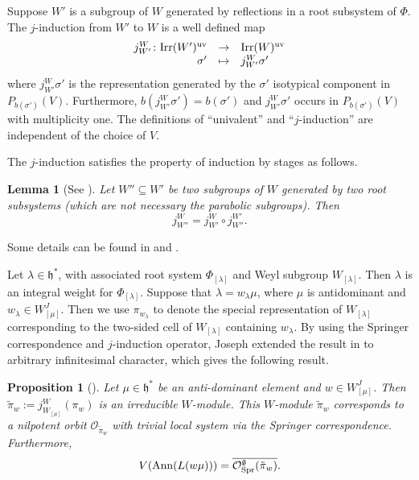 \documentclass[reqno,12pt]{amsart}
\numberwithin{equation}{section}
\theoremstyle{plain}
\newtheorem{Prop}[Thm]{Proposition}
\newtheorem{Lem}[Thm]{Lemma}
\theoremstyle{definition}
\newcommand{\lam}{\lambda}
\newcommand{\Ann}{\mathrm{Ann}}
\renewcommand{\subset}{\subseteq}
\begin{document}
Suppose $W'$ is a subgroup of $W$ generated by reflections in a root subsystem of $\Phi$.   
The $j$-induction from $W'$ to $W$ is a well defined map 
\[
\begin{array}{rcl}
j_{W'}^{W} \colon {\rm Irr}(W')^{\rm uv}& \rightarrow &{\rm Irr}(W)^{\rm uv} \\
\sigma' & \mapsto & j_{W'}^{W}\sigma'
\end{array}
\]
where $j_{W'}^{W}\sigma'$ is the representation generated by the $\sigma'$ 
isotypical component in $P_{b(\sigma')}(V)$. Furthermore, $b(j_{W'}^{W}\sigma') =b(\sigma')$ and $j_{W'}^{W}\sigma'$ occurs in $P_{b(\sigma')}(V)$ with multiplicity one.  
The definitions of ``univalent'' and ``$j$-induction'' are independent of the choice of $V$. 

The $j$-induction satisfies the property of induction by stages as follows. 
\begin{Lem}[{See \cite[Theorem~11.2.4]{Ca85}}]\label{j.1}
Let $W''\subset W'$ be two subgroups of $W$ generated by two root subsystems (which are not necessary the parabolic subgroups). 
Then 
\[
j^W_{W''}=j^W_{W'}\circ j^{W'}_{W''}.
\]
\end{Lem}
Some details can be found in \cite[\S 11.2]{Ca85} and \cite[Chapter~4]{lusztig1984char}.


Let $\lambda\in \mathfrak{h}^*$, with associated root system $\Phi_{[\lambda]}$ and Weyl subgroup $W_{[\lambda]}$. Then $\lam$ is an integral weight for $\Phi_{[\lambda]}$. Suppose that $\lambda=w_{\lambda}\mu$, where $\mu$ is antidominant and $w_{\lambda}\in W_{[\mu]}^J$. Then we use $\pi_{w_{\lam}}$ to denote the special representation of $W_{[\lambda]}$ corresponding to the two-sided cell of $W_{[\lambda]}$ containing $w_{\lam}$. 
By using the Springer correspondence and $j$-induction operator, Joseph extended the result in \cite{BoB1} to arbitrary infinitesimal character, which gives the following result.




 
\begin{Prop}[{\cite[Theorem~3.10]{Jo85}}]\label{2dim}
Let $\mu\in \mathfrak{h}^*$ be an anti-dominant element and   $w\in W_{[\mu]}^J$. 
    Then $\tilde{\pi}_w:=j_{W_{[\mu]}}^W(\pi_w)$ is an
    irreducible $W$-module.   This $W$-module $\tilde{\pi}_w$ corresponds to  a nilpotent orbit $\mathcal{O}_{\tilde{\pi}_w}$
    with trivial local system via the Springer correspondence. Furthermore,
$$V(\Ann (L(w\mu)))=\overline{\mathcal{O}_{\rm Spr}^\mathfrak{g} ( \tilde{\pi}_w)}.$$
\end{Prop}
\end{document}
